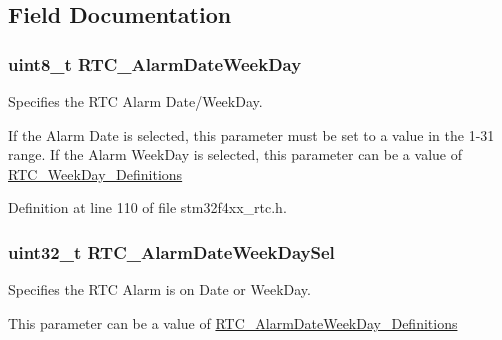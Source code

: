 \subsection{Field Documentation}
\hypertarget{struct_r_t_c___alarm_type_def_a7d6cbb1226c82e91f199446b2601abd0}{
\subsubsection[{R\-T\-C\-\_\-\-Alarm\-Date\-Week\-Day}]{\setlength{\rightskip}{0pt plus 5cm}uint8\-\_\-t R\-T\-C\-\_\-\-Alarm\-Date\-Week\-Day}}\label{struct_r_t_c___alarm_type_def_a7d6cbb1226c82e91f199446b2601abd0}
\begin{DoxyVerb} Specifies the RTC Alarm Date/WeekDay.
\end{DoxyVerb}
 If the Alarm Date is selected, this parameter must be set to a value in the 1-\/31 range. If the Alarm Week\-Day is selected, this parameter can be a value of \hyperlink{group___r_t_c___week_day___definitions}{R\-T\-C\-\_\-\-Week\-Day\-\_\-\-Definitions} 

Definition at line 110 of file stm32f4xx\-\_\-rtc.\-h.

\hypertarget{struct_r_t_c___alarm_type_def_a8fd76a34adc4e9f85a32a23c2b8bde46}{
\subsubsection[{R\-T\-C\-\_\-\-Alarm\-Date\-Week\-Day\-Sel}]{\setlength{\rightskip}{0pt plus 5cm}uint32\-\_\-t R\-T\-C\-\_\-\-Alarm\-Date\-Week\-Day\-Sel}}\label{struct_r_t_c___alarm_type_def_a8fd76a34adc4e9f85a32a23c2b8bde46}
\begin{DoxyVerb} Specifies the RTC Alarm is on Date or WeekDay.
\end{DoxyVerb}
 This parameter can be a value of \hyperlink{group___r_t_c___alarm_date_week_day___definitions}{R\-T\-C\-\_\-\-Alarm\-Date\-Week\-Day\-\_\-\-Definitions} 


